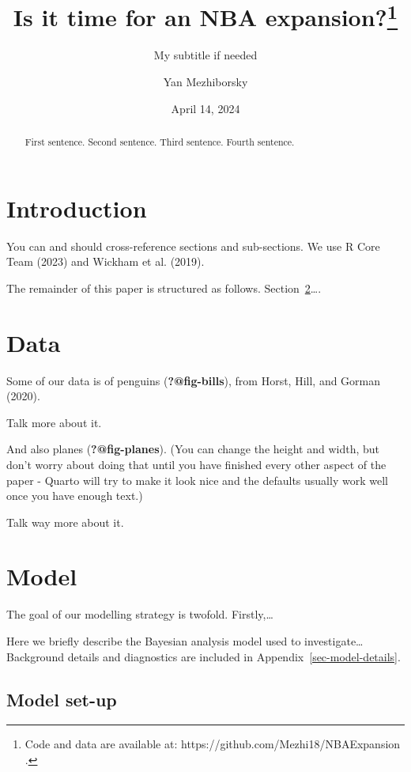 \documentclass[
  letterpaper,
  DIV=11,
  numbers=noendperiod]{scrartcl}
\title{Is it time for an NBA expansion?\thanks{Code and data are
available at: https://github.com/Mezhi18/NBAExpansion .}}
\subtitle{My subtitle if needed}
\author{Yan Mezhiborsky}
\date{April 14, 2024}
\renewcommand*\contentsname{Table of contents}
\newcommand\contentsname{Table of contents}
\begin{document}
\maketitle
\begin{abstract}
First sentence. Second sentence. Third sentence. Fourth sentence.
\end{abstract}

\renewcommand*\contentsname{Table of contents}
{
\hypersetup{linkcolor=}
\setcounter{tocdepth}{3}
\tableofcontents
}
\section{Introduction}\label{introduction}

You can and should cross-reference sections and sub-sections. We use R
Core Team (2023) and Wickham et al. (2019).

The remainder of this paper is structured as follows.
Section~\ref{sec-data}\ldots.

\section{Data}\label{sec-data}

Some of our data is of penguins (\textbf{?@fig-bills}), from Horst,
Hill, and Gorman (2020).

Talk more about it.

And also planes (\textbf{?@fig-planes}). (You can change the height and
width, but don't worry about doing that until you have finished every
other aspect of the paper - Quarto will try to make it look nice and the
defaults usually work well once you have enough text.)

Talk way more about it.

\section{Model}\label{model}

The goal of our modelling strategy is twofold. Firstly,\ldots{}

Here we briefly describe the Bayesian analysis model used to
investigate\ldots{} Background details and diagnostics are included in
Appendix~\ref{sec-model-details}.

\subsection{Model set-up}\label{model-set-up}
\end{document}
